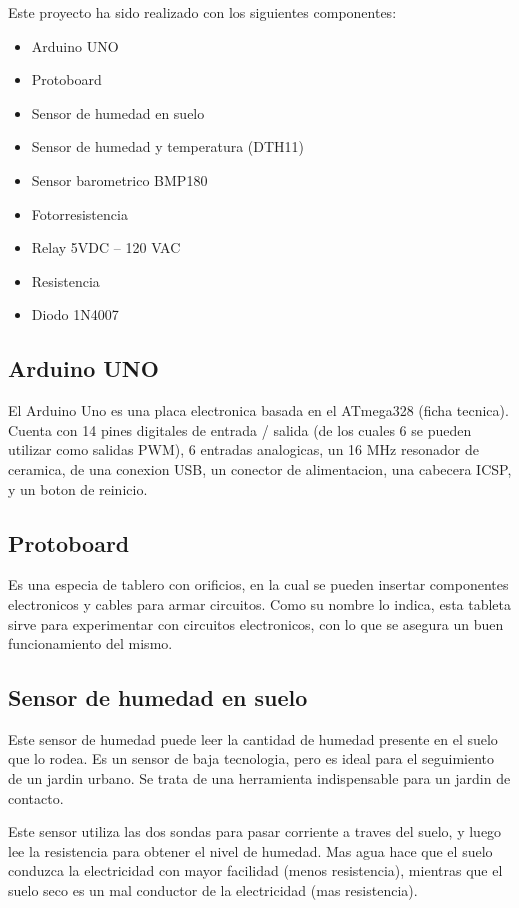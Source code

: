 \documentclass{article}
\begin{document}
Este proyecto ha sido realizado con los siguientes componentes:

\begin{itemize}
	\item Arduino UNO
	\item Protoboard
	\item Sensor de humedad en suelo
	\item Sensor de humedad  y temperatura (DTH11)
	\item Sensor barometrico BMP180
	\item Fotorresistencia
	\item Relay 5VDC – 120 VAC
	\item Resistencia
	\item Diodo 1N4007
\end{itemize}

\subsection{Arduino UNO}
El Arduino Uno es una placa electronica basada en el  ATmega328  (ficha tecnica). Cuenta con 14 pines digitales de entrada / salida (de los cuales 6 se pueden utilizar como salidas PWM), 6 entradas analogicas, un 16  MHz  resonador de ceramica, de una conexion USB, un conector de alimentacion, una cabecera ICSP, y un boton de reinicio.

\subsection{Protoboard}
Es una especia de tablero con orificios, en la cual se pueden insertar componentes electronicos y cables para armar circuitos. Como su nombre lo indica, esta tableta sirve para experimentar con circuitos electronicos, con lo que se asegura un buen funcionamiento del mismo. 

\subsection{Sensor de humedad en suelo}
Este sensor de humedad puede leer la cantidad de humedad presente en el suelo que lo rodea. Es un sensor de baja tecnologia, pero es ideal para el seguimiento de un jardin urbano. Se trata de una herramienta indispensable para un jardin de contacto.

Este sensor utiliza las dos sondas para pasar corriente a traves del suelo, y luego  lee la resistencia para obtener el nivel de humedad. Mas agua hace que el suelo conduzca la electricidad con mayor facilidad (menos resistencia), mientras que el suelo seco es un mal conductor de la electricidad (mas resistencia).
\end{document}
